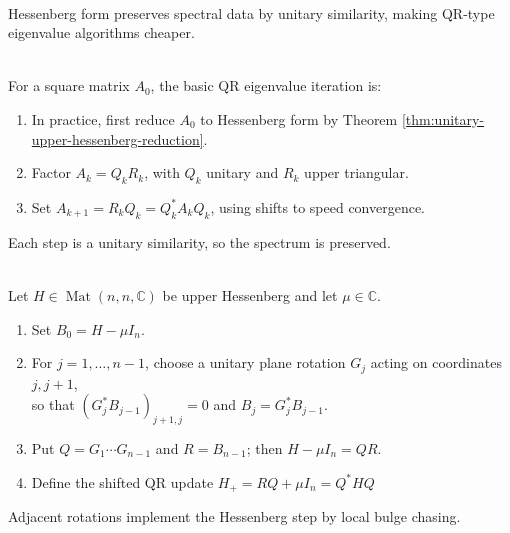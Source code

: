 \begin{perspective} \label{per:hessenberg-before-qr} \\
Hessenberg form preserves spectral data by unitary similarity, making QR-type eigenvalue algorithms cheaper.
\end{perspective}

\begin{method} \label{meth:qr-eigenvalue-algorithm-preview} \\
For a square matrix $A_0$, the basic QR eigenvalue iteration is:
\begin{enumerate}[label=(\roman*)]
\setlength{\itemsep}{0pt}
\item In practice, first reduce $A_0$ to Hessenberg form by Theorem \ref{thm:unitary-upper-hessenberg-reduction}.
\item Factor $A_k=Q_kR_k$, with $Q_k$ unitary and $R_k$ upper triangular.
\item Set $A_{k+1}=R_kQ_k=Q_k^*A_kQ_k$, using shifts to speed convergence.
\end{enumerate}
Each step is a unitary similarity, so the spectrum is preserved.
\end{method}

\begin{method} \label{meth:hessenberg-qr-step-plane-rotations} \\
Let $H\in\operatorname{Mat}(n,n,\mathbb{C})$ be upper Hessenberg and let $\mu\in\mathbb{C}$.
\begin{enumerate}[label=(\roman*)]
\setlength{\itemsep}{0pt}
\item Set $B_0=H-\mu I_n$.
\item For $j=1,\ldots,n-1$, choose a unitary plane rotation $G_j$ acting on coordinates $j,j+1$,\\
so that $(G_j^*B_{j-1})_{j+1,j}=0$ and $B_j=G_j^*B_{j-1}$.
\item Put $Q=G_1\cdots G_{n-1}$ and $R=B_{n-1}$; then $H-\mu I_n=QR$.
\item Define the shifted QR update $H_+=RQ+\mu I_n=Q^*HQ$
\end{enumerate}
Adjacent rotations implement the Hessenberg step by local bulge chasing.
\end{method}

